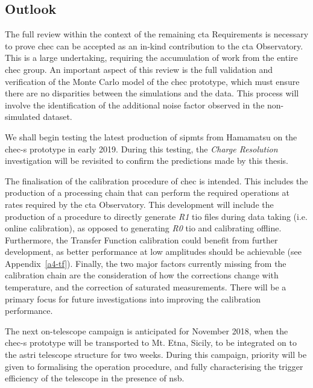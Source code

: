 \subsection{Outlook}
 
The full review within the context of the remaining \gls{cta} Requirements is necessary to prove \gls{chec} can be accepted as an in-kind contribution to the \gls{cta} Observatory. This is a large undertaking, requiring the accumulation of work from the entire \gls{chec} group. An important aspect of this review is the full validation and verification of the Monte Carlo model of the \gls{chec} prototype, which must ensure there are no disparities between the simulations and the data. This process will involve the identification of the additional noise factor observed in the non-simulated dataset.

We shall begin testing the latest production of \glspl{sipmt} from Hamamatsu on the \gls{chec-s} prototype in early 2019. During this testing, the \textit{Charge Resolution} investigation will be revisited to confirm the predictions made by this thesis.

The finalisation of the calibration procedure of \gls{chec} is intended. This includes the production of a processing chain that can perform the required operations at rates required by the \gls{cta} Observatory. This development will include the production of a procedure to directly generate \textit{R1} \gls{tio} files during data taking (i.e. online calibration), as opposed to generating \textit{R0} \gls{tio} and calibrating offline. Furthermore, the Transfer Function calibration could benefit from further development, as better performance at low amplitudes should be achievable (see Appendix~\ref{a4-tf}). Finally, the two major factors currently missing from the calibration chain are the consideration of how the corrections change with temperature, and the correction of saturated measurements. There will be a primary focus for future investigations into improving the calibration performance.

The next on-telescope campaign is anticipated for November 2018, when the \gls{chec-s} prototype will be transported to Mt. Etna, Sicily, to be integrated on to the \gls{astri} telescope structure for two weeks. During this campaign, priority will be given to formalising the operation procedure, and fully characterising the trigger efficiency of the telescope in the presence of \gls{nsb}.